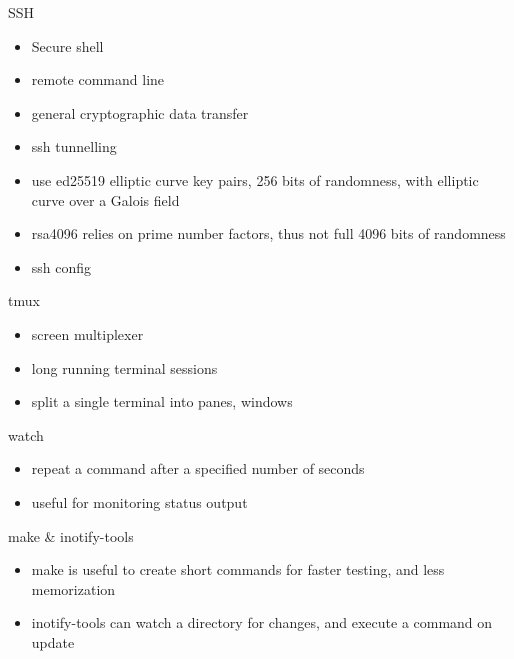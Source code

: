 \documentclass{beamer}
\begin{document}
\begin{frame}{SSH}
  \begin{itemize}
    \item Secure shell
    \item remote command line
    \item general cryptographic data transfer
    \item ssh tunnelling
    \item use ed25519 elliptic curve key pairs, 256 bits of randomness, with
      elliptic curve over a Galois field
    \item rsa4096 relies on prime number factors, thus not full 4096 bits of
      randomness
    \item ssh config
  \end{itemize}
\end{frame}

\begin{frame}{tmux}
  \begin{itemize}
    \item screen multiplexer
    \item long running terminal sessions
    \item split a single terminal into panes, windows
  \end{itemize}
\end{frame}

\begin{frame}{watch}
  \begin{itemize}
    \item repeat a command after a specified number of seconds
    \item useful for monitoring status output
  \end{itemize}
\end{frame}

\begin{frame}{make \& inotify-tools}
  \begin{itemize}
    \item make is useful to create short commands for faster testing, and less
      memorization
    \item inotify-tools can watch a directory for changes, and execute a
      command on update
  \end{itemize}
\end{frame}
\end{document}
